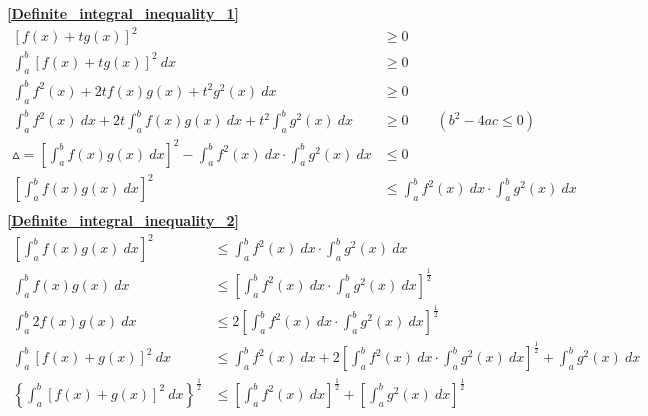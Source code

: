 \textbf{\large \ref{Definite_integral_inequality_1}}
\begin{align*}
	\left[f(x)+tg(x)\right]^2 &\geqslant 0\\
	\int_{a}^{b}\left[f(x)+tg(x)\right]^2\ dx&\geqslant 0\\
	\int_{a}^{b}f^2(x)+2tf(x)g(x)+t^2g^2(x)\ dx&\geqslant 0\\
	\int_{a}^{b}f^2(x)\ dx+2t\int_{a}^{b}f(x)g(x)\ dx+t^2\int_{a}^{b}g^2(x)\ dx&\geqslant 0\qquad(b^2-4ac\leqslant 0)\\
	\vartriangle =\left[\int_{a}^{b}f(x)g(x)\ dx\right]^2-\int_{a}^{b}f^2(x)\ dx\cdot \int_{a}^{b}g^2(x)\ dx&\leqslant 0\\
	\left[\int_{a}^{b}f(x)g(x)\ dx\right]^2 &\leqslant \int_{a}^{b}f^2(x)\ dx\cdot \int_{a}^{b}g^2(x)\ dx \\
\end{align*}
\textbf{\large \ref{Definite_integral_inequality_2}}
\begin{align*}
	\left[\int_{a}^{b}f(x)g(x)\ dx\right]^2&\leqslant \int_{a}^{b}f^2(x)\ dx\cdot \int_{a}^{b}g^2(x)\ dx\\
	\int_{a}^{b}f(x)g(x)\ dx&\leqslant \left[\int_{a}^{b}f^2(x)\ dx\cdot \int_{a}^{b}g^2(x)\ dx\right]^{\frac{1}{2}}\\
	\int_{a}^{b}2f(x)g(x)\ dx&\leqslant 2\left[\int_{a}^{b}f^2(x)\ dx\cdot \int_{a}^{b}g^2(x)\ dx\right]^{\frac{1}{2}}\\
	\int_{a}^{b}\left[f(x)+g(x)\right]^2 \ dx&\leqslant \int_{a}^{b}f^2(x)\ dx+2\left[\int_{a}^{b}f^2(x)\ dx\cdot 
	\int_{a}^{b}g^2(x)\ dx\right]^{\frac{1}{2}}+\int_{a}^{b}g^2(x)\ dx\\
	\left\{\int_{a}^{b}\left[f(x)+g(x)\right]^2 \ dx\right\}^{\frac{1}{2}}&\leqslant \left[\int_{a}^{b}f^2(x)\ dx\right]^{\frac{1}{2}}+\left[\int_{a}^{b}g^2(x)\ dx\right]^{\frac{1}{2}}
\end{align*}